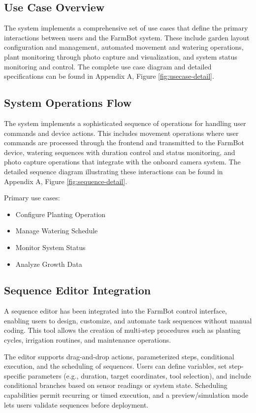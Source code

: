 \subsection{Use Case Overview}
The system implements a comprehensive set of use cases that define the primary interactions between users and the FarmBot system. These include garden layout configuration and management, automated movement and watering operations, plant monitoring through photo capture and visualization, and system status monitoring and control. The complete use case diagram and detailed specifications can be found in Appendix A, Figure \ref{fig:usecase-detail}.

\subsection{System Operations Flow}
The system implements a sophisticated sequence of operations for handling user commands and device actions. This includes movement operations where user commands are processed through the frontend and transmitted to the FarmBot device, watering sequences with duration control and status monitoring, and photo capture operations that integrate with the onboard camera system. The detailed sequence diagram illustrating these interactions can be found in Appendix A, Figure \ref{fig:sequence-detail}.

Primary use cases:
\begin{itemize}
    \item Configure Planting Operation
    \item Manage Watering Schedule
    \item Monitor System Status
    \item Analyze Growth Data
\end{itemize}

\subsection{Sequence Editor Integration}

A sequence editor has been integrated into the FarmBot control interface, enabling users to design, customize, and automate task sequences without manual coding. This tool allows the creation of multi-step procedures such as planting cycles, irrigation routines, and maintenance operations.

The editor supports drag-and-drop actions, parameterized steps, conditional execution, and the scheduling of sequences. Users can define variables, set step-specific parameters (e.g., duration, target coordinates, tool selection), and include conditional branches based on sensor readings or system state. Scheduling capabilities permit recurring or timed execution, and a preview/simulation mode lets users validate sequences before deployment.

